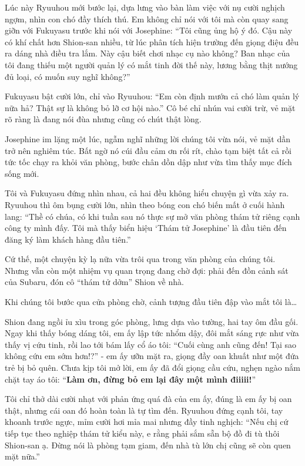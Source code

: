 \documentclass[../main.tex]{subfiles}
\begin{document}
Lúc này Ryuuhou mới bước lại, dựa lưng vào bàn làm việc với nụ cười nghịch ngợm, nhìn con chó đầy thích thú. Em không chỉ nói với tôi mà còn quay sang giỡn với Fukuyasu trước khi nói với Josephine: ``Tôi cũng ủng hộ ý đó. Cậu này có khí chất hơn Shion-san nhiều, từ lúc phân tích hiện trường đến giọng điệu đều ra dáng nhà điều tra lắm. Này cậu biết chơi nhạc cụ nào không? Ban nhạc của tôi đang thiếu một người quản lý có mắt tinh đời thế này, lương bằng thịt nướng đủ loại, có muốn suy nghĩ không?''

Fukuyasu bật cười lớn, chỉ vào Ryuuhou: ``Em còn định mướn cả chó làm quản lý nữa hả? Thật sự là không bỏ lỡ cơ hội nào.'' Cô bé chỉ nhún vai cười trừ, vẻ mặt rõ ràng là đang nói đùa nhưng cũng có chút thật lòng.

Josephine im lặng một lúc, ngẫm nghĩ những lời chúng tôi vừa nói, vẻ mặt dần trở nên nghiêm túc. Bất ngờ nó cúi đầu cảm ơn rối rít, chào tạm biệt tất cả rồi tức tốc chạy ra khỏi văn phòng, bước chân dồn dập như vừa tìm thấy mục đích sống mới.

Tôi và Fukuyasu đứng nhìn nhau, cả hai đều không hiểu chuyện gì vừa xảy ra. Ryuuhou thì ôm bụng cười lớn, nhìn theo bóng con chó biến mất ở cuối hành lang: ``Thề có chúa, có khi tuần sau nó thực sự mở văn phòng thám tử riêng cạnh công ty mình đấy. Tôi mà thấy biển hiệu `Thám tử Josephine' là đầu tiên đến đăng ký làm khách hàng đầu tiên.''

Cứ thế, một chuyện kỳ lạ nữa vừa trôi qua trong văn phòng của chúng tôi. Nhưng vẫn còn một nhiệm vụ quan trọng đang chờ đợi: phải đến đồn cảnh sát của Subaru, đón cô ``thám tử dởm'' Shion về nhà.

Khi chúng tôi bước qua cửa phòng chờ, cảnh tượng đầu tiên đập vào mắt tôi là\dots

Shion đang ngồi ỉu xìu trong góc phòng, lưng dựa vào tường, hai tay ôm đầu gối. Ngay khi thấy bóng dáng tôi, em ấy lập tức nhổm dậy, đôi mắt sáng rực như vừa thấy vị cứu tinh, rồi lao tới bám lấy cổ áo tôi: ``Cuối cùng anh cũng đến! Tại sao không cứu em sớm hơn!?'' - em ấy ưỡn mặt ra, giọng đầy oan khuất như một đứa trẻ bị bỏ quên. Chưa kịp tôi mở lời, em ấy đã đổi giọng cầu cứu, nghẹn ngào nắm chặt tay áo tôi: ``\textbf{Làm ơn, đừng bỏ em lại đây một mình điiiii!}''

Tôi chỉ thở dài cười nhạt với phản ứng quá đà của em ấy, đúng là em ấy bị oan thật, nhưng cái oan đó hoàn toàn là tự tìm đến. Ryuuhou đứng cạnh tôi, tay khoanh trước ngực, mỉm cười hơi mỉa mai nhưng đầy tinh nghịch: ``Nếu chị cứ tiếp tục theo nghiệp thám tử kiểu này, e rằng phải sắm sẵn bộ đồ đi tù thôi Shion-san ạ. Đừng nói là phòng tạm giam, đến nhà tù lớn chị cũng sẽ còn quen mặt nữa.''
\end{document}
